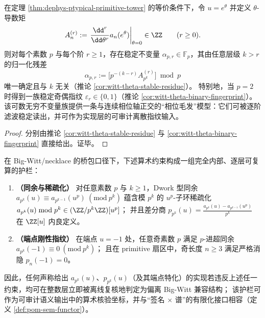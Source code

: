 \begin{theorem}\label{thm:dephys-stable-residue-spectrum}
在定理 \ref{thm:dephys-ptypical-primitive-tower} 的等价条件下，令 \(u=e^{\theta}\) 并定义 \(\theta\)-导数矩
\[
A_n^{(r)}:=\left.\frac{\dd^r}{\dd\theta^r}a_n(e^\theta)\right|_{\theta=0}\in\ZZ\qquad(r\ge 0).
\]
则对每个素数 \(p\) 与每个阶 \(r\ge 1\)，存在稳定不变量 \(\alpha_{p,r}\in\mathbb{F}_p\)，其由任意层级 \(k>r\) 的归一化残差
\[
\alpha_{p,r}:=\bigl[p^{-(k-r)}A_{p^k}^{(r)}\bigr]\bmod p
\]
唯一确定且与 \(k\) 无关（推论 \ref{cor:witt-theta-stable-residue}）。
特别地，当 \(p=2\) 时得到一族稳定奇偶指纹 \(\varepsilon_r\in\{0,1\}\)（推论 \ref{cor:witt-theta-binary-fingerprint}）。
该可数无穷不变量族提供一条与连续相位轴正交的“相位毛发”模型：它们可被逐阶滤波稳定读出，并可作为实现层的可审计离散指纹输入。
\end{theorem}

\begin{proof}
分别由推论 \ref{cor:witt-theta-stable-residue} 与 \ref{cor:witt-theta-binary-fingerprint} 直接给出。证毕。
\end{proof}

\begin{proposition}\label{prop:dephys-padic-guardrails-endpoint-rigidity}
在 Big-Witt/necklace 的桥包口径下，下述算术约束构成一组完全内部、逐层可复算的护栏：
\begin{enumerate}
  \item \textbf{（同余与稀疏化）}
  对任意素数 \(p\) 与 \(k\ge 1\)，Dwork 型同余
  \(
  a_{p^k}(u)\equiv a_{p^{k-1}}(u^p)\ (\mathrm{mod}\ p^k)
  \)
  蕴含模 \(p^k\) 的 \(u^p\)-子环稀疏化
  \(
  a_{p^k}(u)\bmod p^k\in(\ZZ/p^k\ZZ)[u^p]
  \)；
  并且差分商
  \(
  p_{p^k}(u)=\frac{a_{p^k}(u)-a_{p^{k-1}}(u^p)}{p^k}
  \)
  在 \(\ZZ[u]\) 内良定义。
  \item \textbf{（端点刚性指纹）}
  在端点 \(u=-1\) 处，任意奇素数 \(p\) 满足 \(p\)-进超同余
  \(
  a_{p^k}(-1)\equiv 0\ (\mathrm{mod}\ p^k)
  \)；
  且在 primitive 扇区中，奇长度 \(n\ge 3\) 满足严格消隐 \(p_n(-1)=0\)。
\end{enumerate}
因此，任何声称给出 \(a_{p^k}(u)\)、\(p_{p^k}(u)\)（及其端点特化）的实现若违反上述任一约束，均可在整数层立即被离线复核地判定为偏离 Big-Witt 兼容结构；
该护栏可作为可审计语义输出中的算术核验坐标，并与“签名 \(\times\) 谱”的有限化接口相容（定义 \ref{def:pom-sem-functor}）。
\end{proposition}

